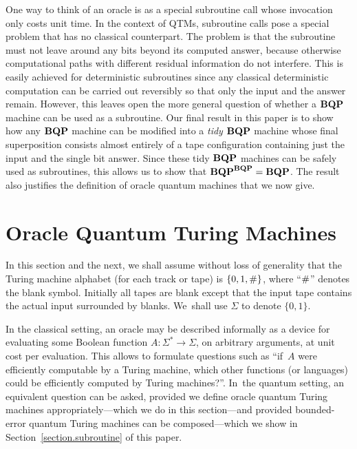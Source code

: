 One way to think of an oracle is as a special subroutine call whose
invocation only costs unit time. In the context of QTMs, subroutine
calls pose a special problem that has no classical counterpart. The
problem is that the
subroutine must not leave around any bits beyond its computed answer,
because otherwise computational paths with different residual information
do not interfere.
This is easily achieved for deterministic
subroutines since any classical deterministic computation can be
carried out reversibly so that only the input and the answer remain.
However, this leaves open the more general question of whether a
$\mbox{\bf BQP}$ machine can be used as a subroutine.  Our final result in this
paper is to show how any $\mbox{\bf BQP}$ machine can be modified into a {\em tidy\/}
$\mbox{\bf BQP}$ machine whose final superposition consists almost entirely of a
tape configuration containing just the input and the single bit
answer.  Since these tidy $\mbox{\bf BQP}$ machines can be safely used as
subroutines, this allows us to show that $\mbox{\bf BQP}^{\mbox{\scriptsize\bf BQP}} = \mbox{\bf BQP}$. The result
also justifies the definition of oracle quantum machines that we now give.

\section{Oracle Quantum Turing Machines}
\label{section.oracle}

In this section and the next,
we shall assume without loss of generality that the
Turing machine alphabet (for each track or tape) is \mbox{$\{0,1,{\#}\}$},
where ``${\#}$'' denotes the blank symbol.  Initially all tapes are blank
except that the input tape contains the actual input surrounded by blanks.
We~shall use $\Sigma$ to denote \mbox{$\{0,1\}$}.

In the classical setting, an oracle may be described informally as a device
for evaluating some Boolean function $A: \Sigma^* \rightarrow \Sigma$, on
arbitrary arguments, at unit cost per evaluation.
This allows to formulate questions such as
``if~$A$ were efficiently computable by a Turing machine,
which other functions (or languages) could be efficiently
computed by Turing machines?''.  In~the quantum setting, an equivalent
question can be asked, provided we define oracle quantum
Turing machines appropriately---which we do in this section---and
provided bounded-error quantum Turing machines can be composed---which
we show in Section~\ref{section.subroutine} of this paper.

